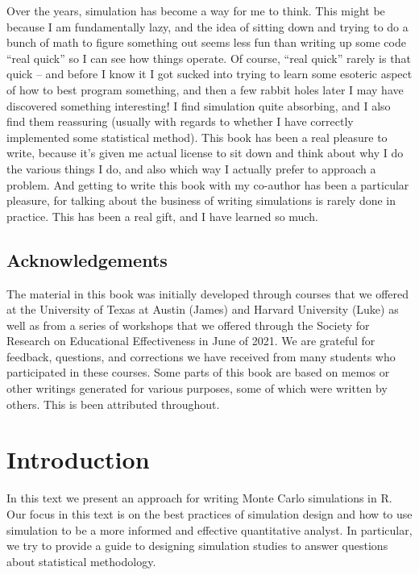 \documentclass[
]{book}
\begin{document}
Over the years, simulation has become a way for me to think.
This might be because I am fundamentally lazy, and the idea of sitting down and trying to do a bunch of math to figure something out seems less fun than writing up some code ``real quick'' so I can see how things operate. Of course, ``real quick'' rarely is that quick -- and before I know it I got sucked into trying to learn some esoteric aspect of how to best program something, and then a few rabbit holes later I may have discovered something interesting! I find simulation quite absorbing, and I also find them reassuring (usually with regards to whether I have correctly implemented some statistical method). This book has been a real pleasure to write, because it's given me actual license to sit down and think about why I do the various things I do, and also which way I actually prefer to approach a problem. And getting to write this book with my co-author has been a particular pleasure, for talking about the business of writing simulations is rarely done in practice. This has been a real gift, and I have learned so much.

\hypertarget{acknowledgements}{%
\section*{Acknowledgements}\label{acknowledgements}}

The material in this book was initially developed through courses that we offered at the University of Texas at Austin (James) and Harvard University (Luke) as well as from a series of workshops that we offered through the Society for Research on Educational Effectiveness in June of 2021. We are grateful for feedback, questions, and corrections we have received from many students who participated in these courses. Some parts of this book are based on memos or other writings generated for various purposes, some of which were written by others. This is been attributed throughout.

\hypertarget{introduction}{%
\chapter{Introduction}\label{introduction}}

In this text we present an approach for writing Monte Carlo simulations in R.
Our focus in this text is on the best practices of simulation design and how to use simulation to be a more informed and effective quantitative analyst.
In particular, we try to provide a guide to designing simulation studies to answer questions about statistical methodology.
\end{document}
